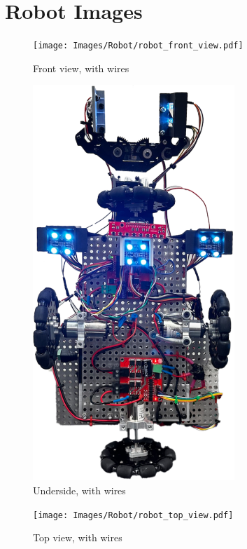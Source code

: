 \documentclass[12pt]{report}
\begin{document}
\section{Robot Images}

\begin{figure}[H]
    \centering
    \texttt{[image: Images/Robot/robot\_front\_view.pdf]}
    \caption{Front view, with wires}
    \label{fig:front-view}
\end{figure}

\begin{figure}[H]
    \centering
    \includegraphics[width=0.68\textwidth]{Images/Robot/robot_underside.pdf}
    \caption{Underside, with wires}
    \label{fig:underside}
\end{figure}

\begin{figure}[H]
    \centering
    \texttt{[image: Images/Robot/robot\_top\_view.pdf]}
    \caption{Top view, with wires}
    \label{fig:topview}
\end{figure}
\end{document}
